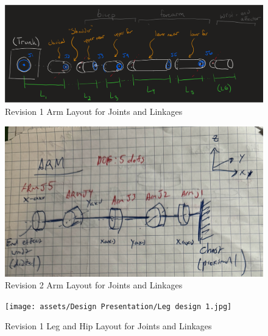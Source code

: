 \documentclass{article}
\begin{document}
\begin{figure}[H]
    \centering
    \includegraphics[scale=0.5]{assets/Design Presentation/arm_layout.png}
    \caption{Revision 1 Arm Layout for Joints and Linkages}
    \label{fig:enter-label}
\end{figure}

\begin{figure}[H]
    \centering
    \includegraphics[scale=0.1]{assets/Design Presentation/Arm Rev 2.jpg}
    \caption{Revision 2 Arm Layout for Joints and Linkages}
    \label{fig:enter-label}
\end{figure}

\begin{figure}[H]
    \centering
    \texttt{[image: assets/Design Presentation/Leg design 1.jpg]}
    \caption{Revision 1 Leg and Hip Layout for Joints and Linkages}
    \label{fig:enter-label}
\end{figure}
\end{document}
